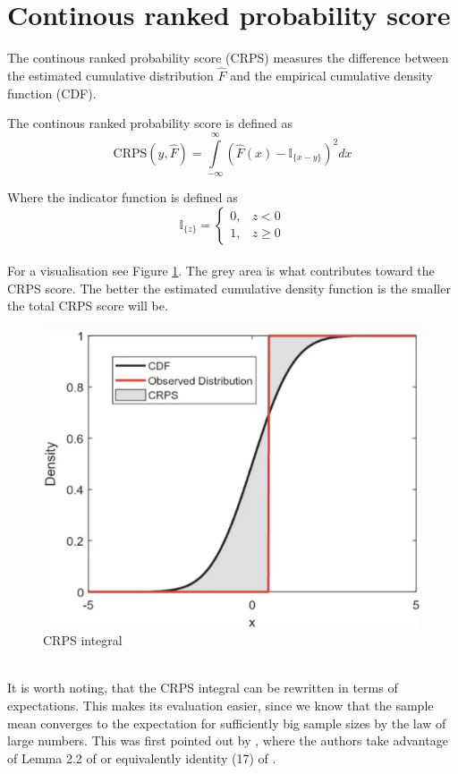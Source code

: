 \section{Continous ranked probability score}
The continous ranked probability score (CRPS) measures the difference between the estimated cumulative distribution $\hat{F}$ and the empirical cumulative density function (CDF).
\begin{definition}\label{def_crps}
    The continous ranked probability score is defined as
    $$
    \mathrm{CRPS}(y, \hat{F})=\int\limits_{-\infty}^{\infty}\left(\hat{F}(x)-\mathbb{I}_{\{x-y\}} \right)^2 dx
    $$
\end{definition}
Where the indicator function is defined as 
    $$\mathbb{I}_{\{z\}}=
\begin{cases}
0, & z<0\\
1, & z \geq 0
\end{cases}$$
\\
For a visualisation see Figure \ref{fig:crps}. The grey area is what contributes toward the CRPS score.
The better the estimated cumulative density function is the smaller the total CRPS score will be.
\begin{figure}
    \includegraphics[width=\textwidth]{images/crps.png}
    \caption{CRPS integral \cite{haben2023core}}
    \label{fig:crps}
  \end{figure}
  \\
It is worth noting, that the CRPS integral can be rewritten in terms of expectations. This makes its evaluation easier, since we know that the sample mean converges to the expectation for sufficiently big sample sizes by the law of large numbers. This was first pointed out by \cite{proper_scores}, where the authors take advantage of Lemma 2.2 of \cite{new_multi_test2} or equivalently identity (17) of \cite{new_multi_tes1}.
